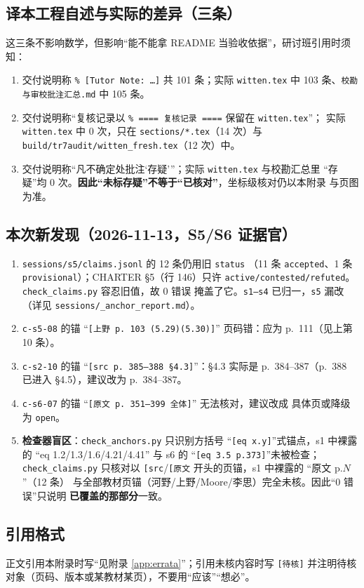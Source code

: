 \subsection{译本工程自述与实际的差异（三条）}

这三条不影响数学，但影响“能不能拿 README 当验收依据”，研讨班引用时须知：

\begin{enumerate}[leftmargin=1.8em,itemsep=2pt]
\item 交付说明称 \texttt{\% [Tutor Note: \dots]} 共 101 条；实际 \texttt{witten.tex}
      中 103 条、\texttt{校勘与审校批注汇总.md} 中 105 条。
\item 交付说明称“复核记录以 \texttt{\% ==== 复核记录 ====} 保留在 \texttt{witten.tex}”；
      实际 \texttt{witten.tex} 中 0 次，只在 \texttt{sections/*.tex}（14 次）与
      \texttt{build/tr7audit/witten\_fresh.tex}（12 次）中。
\item 交付说明称“凡不确定处批注‘存疑’”；实际 \texttt{witten.tex} 与校勘汇总里
      “存疑”均 0 次。\textbf{因此“未标存疑”不等于“已核对”}，坐标级核对仍以本附录
      与页图为准。
\end{enumerate}

\subsection{本次新发现（2026-11-13，S5/S6 证据官）}

\begin{enumerate}[leftmargin=1.8em,itemsep=2pt]
\item \texttt{sessions/s5/claims.jsonl} 的 12 条仍用旧 \texttt{status}
      （11 条 \texttt{accepted}、1 条 \texttt{provisional}）；CHARTER §5（行 146）只许
      \texttt{active/contested/refuted}。\texttt{check\_claims.py} 容忍旧值，故 0 错误
      掩盖了它。\texttt{s1--s4} 已归一，\texttt{s5} 漏改（详见
      \texttt{sessions/\_anchor\_report.md}）。
\item \texttt{c-s5-08} 的锚 “\texttt{[上野 p.~103 (5.29)(5.30)]}” 页码错：应为
      p.~111（见上第 10 条）。
\item \texttt{c-s2-10} 的锚 “\texttt{[src p.~385--388 §4.3]}”：§4.3 实际是
      p.~384--387（p.~388 已进入 §4.5），建议改为 p.~384--387。
\item \texttt{c-s6-07} 的锚 “\texttt{[原文 p.~351--399 全体]}” 无法核对，建议改成
      具体页或降级为 \texttt{open}。
\item \textbf{检查器盲区}：\texttt{check\_anchors.py} 只识别方括号
      “\texttt{[eq x.y]}”式锚点，s1 中裸露的 “eq 1.2/1.3/1.6/4.21/4.41” 与 s6 的
      “\texttt{[eq 3.5 p.373]}”未被检查；\texttt{check\_claims.py} 只核对以
      \texttt{[src}/\texttt{[原文} 开头的页锚，s1 中裸露的 “原文 p.$N$”（12 条）
      与全部教材页锚（河野/上野/Moore/李思）完全未核。因此“0 错误”只说明
      \textbf{已覆盖的那部分}一致。
\end{enumerate}

\subsection{引用格式}

正文引用本附录时写“见附录 \ref{app:errata}”；引用未核内容时写
\texttt{[待核]} 并注明待核对象（页码、版本或某教材某页），不要用“应该”“想必”。
